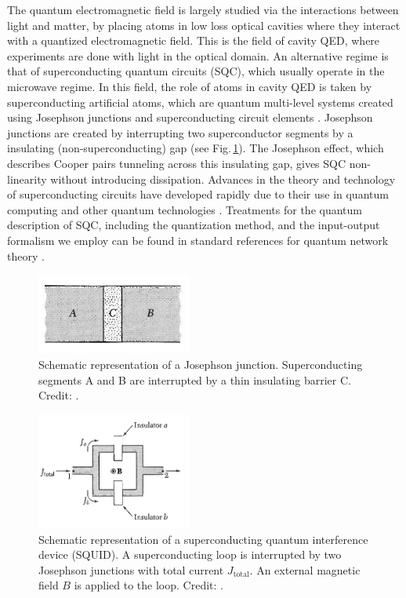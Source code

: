 The quantum electromagnetic field is largely studied via the interactions between light and matter, by placing atoms in low loss optical cavities where they interact with a quantized electromagnetic field. This is the field of cavity QED, where experiments are done with light in the optical domain. An alternative regime is that of superconducting quantum circuits (SQC), which usually operate in the microwave regime. In this field, the role of atoms in cavity QED is taken by superconducting artificial atoms, which are quantum multi-level systems created using Josephson junctions and superconducting circuit elements \cite{Gu2017}. Josephson junctions are created by interrupting two superconductor segments by a insulating (non-superconducting) gap (see Fig.\,\ref{fig:Kittel_JJ}). The Josephson effect, which describes Cooper pairs tunneling across this insulating gap, gives SQC non-linearity without introducing dissipation.
Advances in the theory and technology of superconducting circuits have developed rapidly due to their use in quantum computing and other quantum technologies \cite{Krantz2019}.
Treatments for the quantum description of SQC, including the quantization method, and the input-output formalism we employ can be found in standard references for quantum network theory \cite{Yurke1984, Vool2017}.

\begin{figure}[ht]
    \includegraphics[width=2in, keepaspectratio]{figures/intro/Kittel_Josephson.png}
    \caption{Schematic representation of a Josephson junction. Superconducting segments A and B are interrupted by a thin insulating barrier C. Credit: \protect\cite{Kittel1996_Solid_State}.}
    \label{fig:Kittel_JJ}
\end{figure}

\begin{figure}
    \includegraphics[width=2in, keepaspectratio]{figures/intro/Kittel_SQUID.png}
    \caption{Schematic representation of a superconducting quantum interference device (SQUID). A superconducting loop is interrupted by two Josephson junctions with total current $J_{\text{total}}$. An external magnetic field $B$ is applied to the loop. Credit: \protect\cite{Kittel1996_Solid_State}.}
    \label{fig:Kittel_SQUID}
\end{figure}

